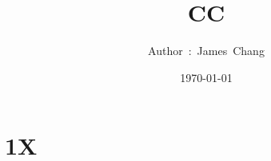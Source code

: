 

\title{CC}
\author{ {\Biohazard} \hspace{1.5mm} \hspace{1.5mm} Author\ :\ James\ Chang}
\date{\today}


\large

\tableofcontents

\chapter{1X}










